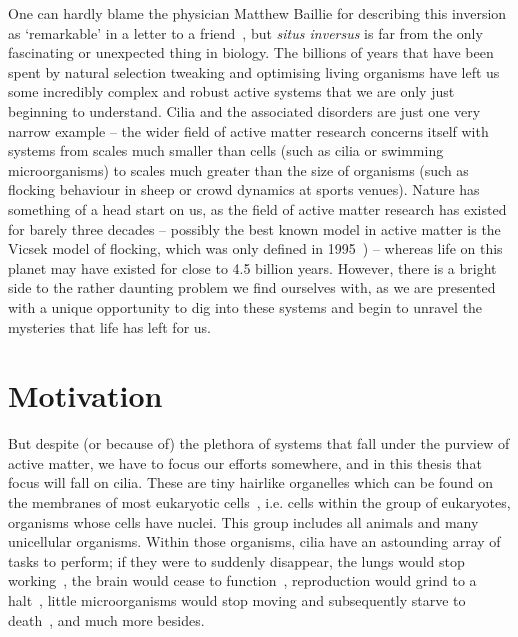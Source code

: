One can hardly blame the physician Matthew Baillie for describing this inversion as `remarkable' in a letter to a friend~\cite{baillie_xxi_1997}, but \textit{situs inversus} is far from the only fascinating or unexpected thing in biology. The billions of years that have been spent by natural selection tweaking and optimising living organisms have left us some incredibly complex and robust active systems that we are only just beginning to understand. Cilia and the associated disorders are just one very narrow example -- the wider field of active matter research concerns itself with systems from scales much smaller than cells (such as cilia or swimming microorganisms) to scales much greater than the size of organisms (such as flocking behaviour in sheep or crowd dynamics at sports venues). Nature has something of a head start on us, as the field of active matter research has existed for barely three decades -- possibly the best known model in active matter is the Vicsek model of flocking, which was only defined in 1995~) -- whereas life on this planet may have existed for close to 4.5 billion years. However, there is a bright side to the rather daunting problem we find ourselves with, as we are presented with a unique opportunity to dig into these systems and begin to unravel the mysteries that life has left for us.


\section{Motivation}

But despite (or because of) the plethora of systems that fall under the purview of active matter, we have to focus our efforts somewhere, and in this thesis that focus will fall on cilia. These are tiny hairlike organelles which can be found on the membranes of most eukaryotic cells~, i.e. cells within the group of eukaryotes, organisms whose cells have nuclei. This group includes all animals and many unicellular organisms. Within those organisms, cilia have an astounding array of tasks to perform; if they were to suddenly disappear, the lungs would stop working~, the brain would cease to function~, reproduction would grind to a halt~, little microorganisms would stop moving and subsequently starve to death~, and much more besides.

